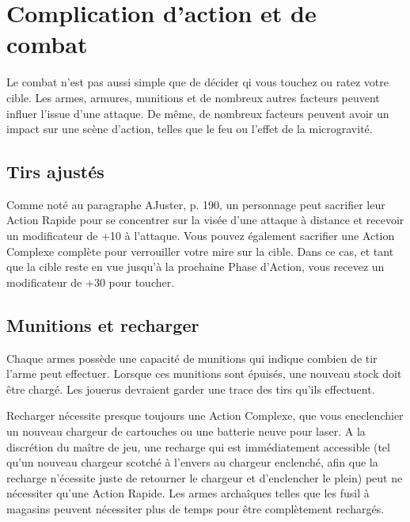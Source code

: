 \section{Complication d'action et de combat} \label{sec:action-combat-comp} 

Le combat n'est pas aussi simple que de décider qi vous touchez ou ratez votre cible. Les armes, armures, munitions et de nombreux autres facteurs peuvent influer l'issue d'une attaque. De même, de nombreux facteurs peuvent avoir un impact sur une scène d'action, telles que le feu ou l'effet de la microgravité. 



\subsection{Tirs ajustés} \label{sec:aimed-shots} 

Comme noté au paragraphe AJuster, p. 190, un personnage peut sacrifier leur Action Rapide pour se concentrer sur la visée d'une attaque à distance et recevoir un modificateur de +10 à l'attaque. Vous pouvez également sacrifier une Action Complexe complète pour verrouiller votre mire sur la cible. Dans ce cas, et tant que la cible reste en vue jusqu'à la prochaine Phase d'Action, vous recevez un modificateur de +30 pour toucher. 



\subsection{Munitions et recharger} \label{sec:ammunition-reloading} 

Chaque armes possède une capacité de munitions qui indique combien de tir l'arme peut effectuer. Lorsque ces munitions sont épuisés, une nouveau stock doit être chargé. Les jouerus devraient garder une trace des tirs qu'ils effectuent. 

Recharger nécessite presque toujours une Action Complexe, que vous eneclenchier un nouveau chargeur de cartouches ou une batterie neuve pour laser. A la discrétion du maître de jeu, une recharge qui est immédiatement accessible (tel qu'un nouveau chargeur scotché à l'envers au chargeur enclenché, afin que la recharge n'écessite juste de retourner le chargeur et d'enclencher le plein) peut ne nécessiter qu'une Action Rapide. Les armes archaîques telles que les fusil à magasins peuvent nécessiter plus de temps pour être complètement rechargés. 



